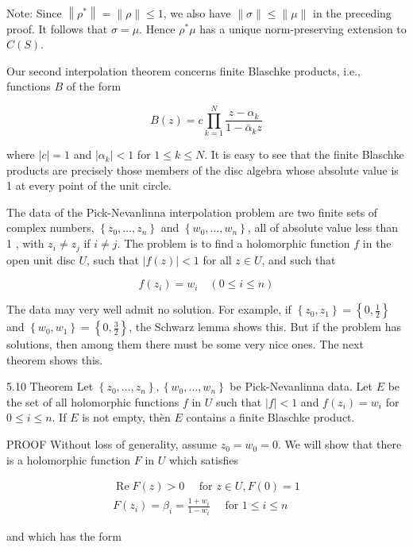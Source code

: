 \documentclass[10pt]{article}
\begin{document}
Note: Since $\left\|\rho^{*}\right\|=\|\rho\| \leq 1$, we also have $\|\sigma\| \leq\|\mu\|$ in the preceding proof. It follows that $\sigma=\mu$. Hence $\rho^{*} \mu$ has a unique norm-preserving extension to $C(S)$.

Our second interpolation theorem concerns finite Blaschke products, i.e., functions $B$ of the form

$$
B(z)=c \prod_{k=1}^{N} \frac{z-\alpha_{k}}{1-\bar{\alpha}_{k} z}
$$

where $|c|=1$ and $\left|\alpha_{k}\right|<1$ for $1 \leq k \leq N$. It is easy to see that the finite Blaschke products are precisely those members of the disc algebra whose absolute value is 1 at every point of the unit circle.

The data of the Pick-Nevanlinna interpolation problem are two finite sets of complex numbers, $\left\{z_{0}, \ldots, z_{n}\right\}$ and $\left\{w_{0}, \ldots, w_{n}\right\}$, all of absolute value less than 1 , with $z_{i} \neq z_{j}$ if $i \neq j$. The problem is to find a holomorphic function $f$ in the open unit disc $U$, such that $|f(z)|<1$ for all $z \in U$, and such that

$$
f\left(z_{i}\right)=w_{i} \quad(0 \leq i \leq n)
$$

The data may very well admit no solution. For example, if $\left\{z_{0}, z_{1}\right\}=\left\{0, \frac{1}{2}\right\}$ and $\left\{w_{0}, w_{1}\right\}=\left\{0, \frac{3}{2}\right\}$, the Schwarz lemma shows this. But if the problem has solutions, then among them there must be some very nice ones. The next theorem shows this.

5.10 Theorem Let $\left\{z_{0}, \ldots, z_{n}\right\},\left\{w_{0}, \ldots, w_{n}\right\}$ be Pick-Nevanlinna data. Let $E$ be the set of all holomorphic functions $f$ in $U$ such that $|f|<1$ and $f\left(z_{i}\right)=w_{i}$ for $0 \leq i \leq n$. If $E$ is not empty, thèn $E$ contains a finite Blaschke product.

PROOF Without loss of generality, assume $z_{0}=w_{0}=0$. We will show that there is a holomorphic function $F$ in $U$ which satisfies

$$
\begin{gathered}
\operatorname{Re} F(z)>0 \quad \text { for } z \in U, F(0)=1 \\
F\left(z_{i}\right)=\beta_{i}=\frac{1+w_{i}}{1-w_{i}} \quad \text { for } 1 \leq i \leq n
\end{gathered}
$$

and which has the form
\end{document}
